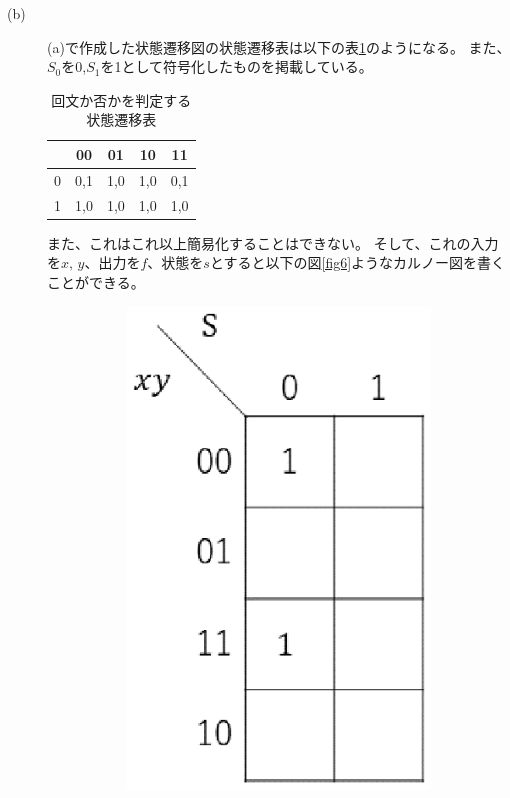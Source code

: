 \documentclass{jsarticle}
\begin{document}
\begin{description}
\begin{description}
            \item[(b)]
            (a)で作成した状態遷移図の状態遷移表は以下の表\ref{tab5}のようになる。
            また、$S_0$を0,$S_1$を1として符号化したものを掲載している。
            \begin{table}[H]
                \centering
                \caption{回文か否かを判定する状態遷移表}
                \label{tab5}
                \begin{tabular}{|c|c|c|c|c|} \hline
                     & 00 & 01 & 10 & 11 \\ \hline
                    0 & 0,1 & 1,0 & 1,0 & 0,1 \\ \hline
                    1 & 1,0 & 1,0 & 1,0 & 1,0 \\ \hline
                \end{tabular}
            \end{table}
            また、これはこれ以上簡易化することはできない。
            そして、これの入力を$x,\, y$、出力を$f$、状態を$s$とすると以下の図\ref{fig6}ようなカルノー図を書くことができる。
            \begin{figure}[H]
                \centering
                \begin{subfigure}{0.2\columnwidth}
                    \centering
                    \includegraphics[width=\columnwidth]{fig_6_f.eps}

\end{subfigure}
\end{figure}
\end{description}
\end{description}
\end{document}
